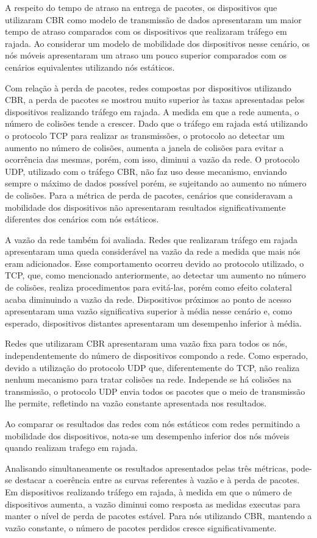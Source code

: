 \documentclass[12pt]{article}
\begin{document}
A respeito do tempo de atraso na entrega de pacotes, os dispositivos que utilizaram CBR como modelo de transmissão de dados apresentaram um maior tempo de atraso comparados com os dispositivos que realizaram tráfego em rajada. Ao considerar um modelo de mobilidade dos dispositivos nesse cenário, os nós móveis apresentaram um atraso um pouco superior comparados com os cenários equivalentes utilizando nós estáticos.

Com relação à perda de pacotes, redes compostas por dispositivos utilizando CBR, a perda de pacotes se mostrou muito superior às taxas apresentadas pelos dispositivos realizando tráfego em rajada. A medida em que a rede aumenta, o número de colisões tende a crescer. Dado que o tráfego em rajada está utilizando o protocolo TCP para realizar as transmissões, o protocolo ao detectar um aumento no número de colisões, aumenta a janela de colisões para evitar a ocorrência das mesmas, porém, com isso, diminui a vazão da rede. O protocolo UDP, utilizado com o tráfego CBR, não faz uso desse mecanismo, enviando sempre o máximo de dados possível porém, se sujeitando ao aumento no número de colisões. Para a métrica de perda de pacotes, cenários que consideravam a mobilidade dos dispositivos não apresentaram resultados significativamente diferentes dos cenários com nós estáticos.

A vazão da rede também foi avaliada. Redes que realizaram tráfego em rajada apresentaram uma queda considerável na vazão da rede a medida que mais nós eram adicionados. Esse comportamento ocorreu devido ao protocolo utilizado, o TCP, que, como mencionado anteriormente, ao detectar um aumento no número de colisões, realiza procedimentos para evitá-las, porém como efeito colateral acaba diminuindo a vazão da rede. Dispositivos próximos ao ponto de acesso apresentaram uma vazão significativa superior à média nesse cenário e, como esperado, dispositivos distantes apresentaram um desempenho inferior à média.

Redes que utilizaram CBR apresentaram uma vazão fixa para todos os nós, independentemente do número de dispositivos compondo a rede. Como esperado, devido a utilização do protocolo UDP que, diferentemente do TCP, não realiza nenhum mecanismo para tratar colisões na rede. Independe se há colisões na transmissão, o protocolo UDP envia todos os pacotes que o meio de transmissão lhe permite, refletindo na vazão constante apresentada nos resultados.

Ao comparar os resultados das redes com nós estáticos com redes permitindo a mobilidade dos dispositivos, nota-se um desempenho inferior dos nós móveis quando realizam  trafego em rajada.

Analisando simultaneamente os resultados apresentados pelas três métricas, pode-se destacar a coerência entre as curvas referentes à vazão e à perda de pacotes. Em dispositivos realizando tráfego em rajada, à medida em que o número de dispositivos aumenta, a vazão diminui como resposta as medidas executas para manter o nível de perda de pacotes estável. Para nós utilizando CBR, mantendo a vazão constante, o número de pacotes perdidos cresce significativamente.



\end{document}
